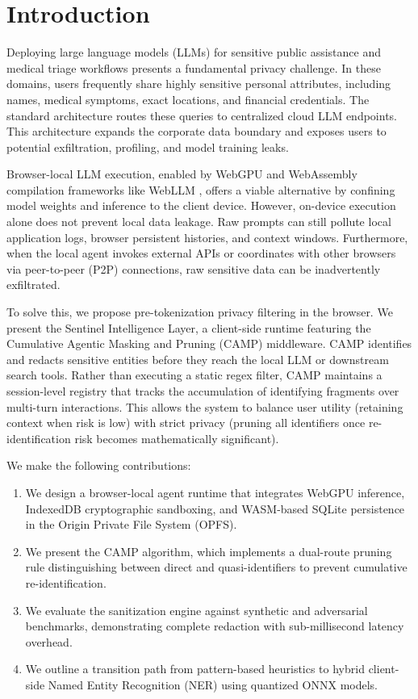 \documentclass[conference]{IEEEtran}
\begin{document}
\section{Introduction}

Deploying large language models (LLMs) for sensitive public assistance and medical triage workflows presents a fundamental privacy challenge. In these domains, users frequently share highly sensitive personal attributes, including names, medical symptoms, exact locations, and financial credentials. The standard architecture routes these queries to centralized cloud LLM endpoints. This architecture expands the corporate data boundary and exposes users to potential exfiltration, profiling, and model training leaks.

Browser-local LLM execution, enabled by WebGPU and WebAssembly compilation frameworks like WebLLM \cite{webllm}, offers a viable alternative by confining model weights and inference to the client device. However, on-device execution alone does not prevent local data leakage. Raw prompts can still pollute local application logs, browser persistent histories, and context windows. Furthermore, when the local agent invokes external APIs or coordinates with other browsers via peer-to-peer (P2P) connections, raw sensitive data can be inadvertently exfiltrated.

To solve this, we propose pre-tokenization privacy filtering in the browser. We present the Sentinel Intelligence Layer, a client-side runtime featuring the Cumulative Agentic Masking and Pruning (CAMP) middleware. CAMP identifies and redacts sensitive entities before they reach the local LLM or downstream search tools. Rather than executing a static regex filter, CAMP maintains a session-level registry that tracks the accumulation of identifying fragments over multi-turn interactions. This allows the system to balance user utility (retaining context when risk is low) with strict privacy (pruning all identifiers once re-identification risk becomes mathematically significant).

We make the following contributions:
\begin{enumerate}
    \item We design a browser-local agent runtime that integrates WebGPU inference, IndexedDB cryptographic sandboxing, and WASM-based SQLite persistence in the Origin Private File System (OPFS).
    \item We present the CAMP algorithm, which implements a dual-route pruning rule distinguishing between direct and quasi-identifiers to prevent cumulative re-identification.
    \item We evaluate the sanitization engine against synthetic and adversarial benchmarks, demonstrating complete redaction with sub-millisecond latency overhead.
    \item We outline a transition path from pattern-based heuristics to hybrid client-side Named Entity Recognition (NER) using quantized ONNX models.
\end{enumerate}
\end{document}
